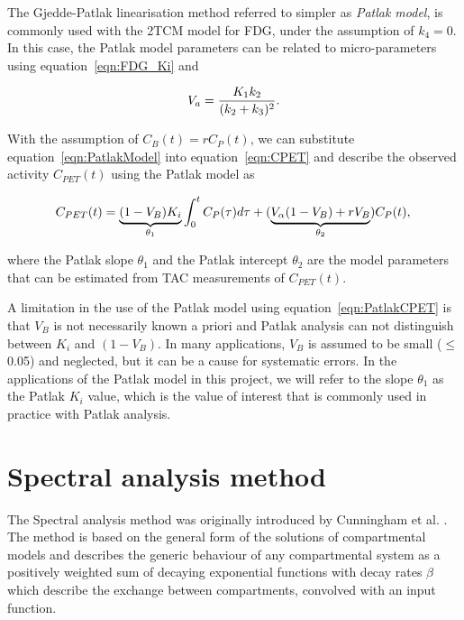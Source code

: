 The Gjedde-Patlak linearisation method referred to simpler as \textit{Patlak model}, is commonly used with the 2TCM model for FDG, under the assumption of $k_4=0$. In this case, the Patlak model parameters can be related to micro-parameters using equation~\ref{eqn:FDG_Ki} and 

\begin{equation} 
V_a  = \frac{K_1 k_2}{(k_2+k_3)^2} \\ . \\ 
\end{equation}

With the assumption of $C_{B}(t) = r C_{P}(t)$, we can substitute equation~\ref{eqn:PatlakModel} into equation~\ref{eqn:CPET} and describe the observed activity $C_{PET}(t)$ using the Patlak model as

\begin{equation} 
{C_{PET}}(t)  = \underbrace{(1-V_{B})K_i}_{\theta_1} \int_{0}^{t} C_{P}(\tau) d\tau +  (\underbrace{V_{\alpha}(1-V_{B})+r V_{B}}_{\theta_2}) C_{P}(t) \\ , \\
\label{eqn:PatlakCPET}
\end{equation}

where the Patlak slope $\theta_1$ and the Patlak intercept $\theta_2$ are the model parameters that can be estimated from TAC measurements of ${C_{PET}}(t)$. 

A limitation in the use of the Patlak model using equation~\ref{eqn:PatlakCPET} is that $V_B$ is not necessarily known a priori and Patlak analysis can not distinguish between $K_i$ and $(1-V_B)$. In many applications, $V_B$ is assumed to be small ($\leq$0.05) and neglected, but it can be a cause for systematic errors. 
In the applications of the Patlak model in this project, we will refer to the slope $\theta_1$ as the Patlak $K_i$ value, which is the value of interest that is commonly used in practice with Patlak analysis.


\section{Spectral analysis method}
The Spectral analysis method was originally introduced by Cunningham et al. \cite{Cunningham1993}. The method is based on the general form of the solutions of compartmental models and describes the generic behaviour of any compartmental system as a positively weighted sum of decaying exponential functions with decay rates $\beta$ which describe the exchange between compartments, convolved with an input function. 

